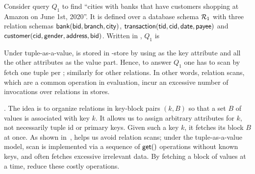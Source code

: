 \begin{example}\label{exa-taav}
Consider query $Q_{1}$ to find ``cities with banks that
have customers shopping at %
Amazon on
June 1st, 2020''. It is
defined over
a database schema ${\mathcal R}_{1}$ with three relation schemas
$\protect\mathsf{bank}(\protect\mathsf{bid},\allowbreak \protect\mathsf{branch},\allowbreak \protect\mathsf{city})$,
$\protect\mathsf{transaction}(\protect\mathsf{tid},\allowbreak \protect\mathsf{cid},\allowbreak \protect\mathsf{date},\allowbreak
\protect\mathsf{payee})$ and $\protect\mathsf{customer}(\protect\mathsf{cid},\allowbreak \protect\mathsf{gender},\allowbreak
\protect\mathsf{address},\allowbreak \protect\mathsf{bid})$. Written in \SQL, $Q_{1}$ is

\vspace{-0.4ex}
{\small
  }
\vspace{-0.7ex}

Under tuple-as-a-value,  is stored in \kv-store
by using  as the key attribute and all the other
attributes as the value part. Hence, to answer $Q_{1}$ one
has to scan  by fetch one tuple per \get;
similarly  for other relations. In other words, relation scans,
which are a common operation in \SQL evaluation, incur an excessive
number of \get invocations over relations in \kv stores.
\end{example}

\vspace{0.6ex}
. The idea is to organize
relations in key-block pairs $(k, B)$ so that a set $B$ of values
is associated with key $k$. It allows us to assign arbitrary
attributes for $k$, not necessarily tuple id or primary keys.
Given such a key $k$, it fetches its block $B$ at once.
As shown in~\cite{VLDB19}, \baav helps us avoid relation scans;
under the tuple-as-a-value model, scan is implemented via
a sequence %
of $\protect\mathsf{get}()$ operations without known keys,
and often fetches excessive irrelevant data. By fetching a block
of values at a time, \baav reduce these costly operations.



